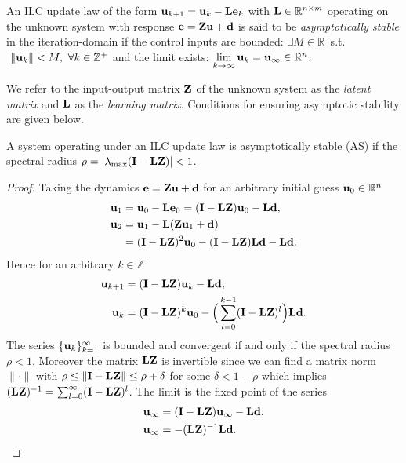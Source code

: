 \begin{defn} An ILC update law of the form $\sysInput_{k+1} = \sysInput_{k} - \lmatrix \error_{k}$ with $\lmatrix \in \mathbb{R}^{n \times m}$ operating on the unknown system with response $\error = \latentMat \sysInput + \linDist$ is said to be \emph{asymptotically stable} in the iteration-domain if the control inputs are bounded: $\exists M \in \mathbb{R} \ $ s.t. $\ \|\sysInput_k\| < M, \ \forall k \in \mathbb{Z}^{+}$ and the limit exists: $\lim\limits_{k \to \infty}\sysInput_k = \sysInput_{\infty} \in \mathbb{R}^{n}$. \end{defn}
%
We refer to the input-output matrix $\latentMat$ of the unknown system as the \emph{latent matrix} and $\lmatrix$ as the \emph{learning matrix}. Conditions for ensuring asymptotic stability are given below.
%
\begin{lem}[AS] \label{AS} A system operating under an ILC update law is asymptotically stable (AS) if the spectral radius $\rho = |\lambda_{\mathrm{max}}(\vec{I} - \lmatrix\latentMat)| < 1$. \end{lem}
%
\begin{proof}
Taking the dynamics $\error = \latentMat \sysInput + \linDist$ for an arbitrary initial guess $\sysInput_0 \in \mathbb{R}^{n}$
\begin{align}
\sysInput_1 &= \sysInput_0 - \lmatrix\error_0 = (\vec{I} - \lmatrix\latentMat)\sysInput_0 - \lmatrix\linDist, \\
\sysInput_2 &= \sysInput_1 - \lmatrix(\latentMat\sysInput_1 + \linDist) \\ 
&= (\vec{I} - \lmatrix\latentMat)^{2}\sysInput_0 - (\vec{I} - \lmatrix\latentMat)\lmatrix\linDist - \lmatrix\linDist.
\end{align}
%
\noindent Hence for an arbitrary $k \in \mathbb{Z}^{+}$
%
\begin{align}
\sysInput_{k+1} &= (\vec{I} - \lmatrix\latentMat)\sysInput_{k} - \lmatrix\linDist, \\
\sysInput_k &= (\vec{I} - \lmatrix\latentMat)^{k}\sysInput_0 - \Big(\sum_{l=0}^{k-1}(\vec{I} - \lmatrix\latentMat)^{l}\Big)\lmatrix\linDist.
\end{align}
%
\noindent The series $\{\sysInput_{k}\}_{k=1}^{\infty}$ is bounded and convergent if and only if the spectral radius $\rho < 1$. Moreover the matrix $\lmatrix\latentMat$ is invertible since we can find a matrix norm $\|\cdot\|$ with $\rho \leq \|\vec{I} - \lmatrix\latentMat\| \leq \rho + \delta$ for some $\delta < 1 - \rho$ which implies $(\lmatrix\latentMat)^{-1} = \sum_{l=0}^{\infty}(\vec{I} - \lmatrix\latentMat)^{l}$. The limit is the fixed point of the series
%
\begin{align}
\sysInput_{\infty} &= (\vec{I} - \lmatrix\latentMat)\sysInput_{\infty} - \lmatrix\linDist, \\
\sysInput_{\infty} &= -(\lmatrix\latentMat)^{-1}\lmatrix\linDist.
\end{align}
%
\end{proof}
